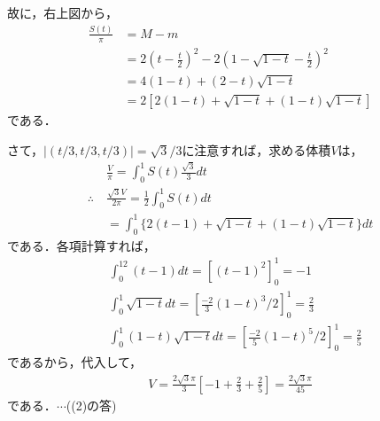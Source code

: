 \documentclass[a4j]{jarticle}
\begin{document}
\begin{multicols}{2}
故に，右上図から，
     \begin{align*}
     \frac{S(t)}{\pi}&=M-m \\
     &=2\left(t-\frac{t}{2}\right)^2-2\left(1-\sqrt{1-t}-\frac{t}{2}\right)^2     \\
     &=4(1-t)+(2-t)\sqrt{1-t} \\
     &=2[2(1-t)+\sqrt{1-t}+(1-t)\sqrt{1-t}]
     \end{align*}
である．

さて，$|(t/3,t/3,t/3)|=\sqrt{3}/3$に注意すれば，求める体積$V$は，
     \begin{align*}
     &\frac{V}{\pi}=\int_0^1S(t)\frac{\sqrt{3}}{3}dt \\
     \therefore \  &\frac{\sqrt{3}V}{2\pi}=\frac{1}{2}\int_0^1S(t)dt \\
     &=\int_0^1\{2(t-1)+\sqrt{1-t}+(1-t)\sqrt{1-t}\}dt
     \end{align*}
である．各項計算すれば，
     \begin{align*}
     &\int_0^12(t-1)dt=\left[(t-1)^2\right]_0^1=-1 \\
     &\int_0^1\sqrt{1-t}dt=\left[\frac{-2}{3}(1-t)^3/2\right]_0^1=\frac{2}{3} \\
     &\int_0^1(1-t)\sqrt{1-t}dt=\left[\frac{-2}{5}(1-t)^5/2\right]_0^1=\frac{2}{5}
     \end{align*}
であるから，代入して，
     \begin{align*}
     V=\frac{2\sqrt{3}\pi}{3}\left[-1+\frac{2}{3}+\frac{2}{5}\right]=\frac{2\sqrt{3}\pi}{45}
     \end{align*}
である．$\cdots$((2)の答)
\newpage
\end{multicols}
\end{document}
